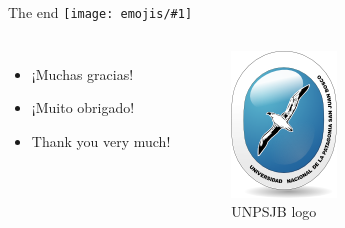 \documentclass{beamer}
\newcommand{\emoji}[1]{\texttt{[image: emojis/\#1]}}
\begin{document}
\begin{frame}[fragile]{The end \emoji{angel.png}}
    \begin{columns}
            \begin{itemize}
                \item ¡Muchas gracias!
                \item ¡Muito obrigado!
                \item Thank you very much!
            \end{itemize}
            \begin{figure}[H]
                \centering
                \includegraphics[]{logoUnpsjb.png}
                \caption{UNPSJB logo}
            \end{figure}
    \end{columns}
\end{frame}
\end{document}
